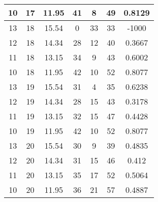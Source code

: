\documentclass[letterpaper, 12pt]{article}
\begin{document}
\begin{longtable}{|c|c|c|c|c|c|c|}
10 & 17 & 11.95 & 41 & 8 & 49 & 0.8129 \\
\hline
13 & 18 & 15.54 & 0 & 33 & 33 & -1000 \\
\hline
12 & 18 & 14.34 & 28 & 12 & 40 & 0.3667 \\
\hline
11 & 18 & 13.15 & 34 & 9 & 43 & 0.6002 \\
\hline
10 & 18 & 11.95 & 42 & 10 & 52 & 0.8077 \\
\hline
13 & 19 & 15.54 & 31 & 4 & 35 & 0.6238 \\
\hline
12 & 19 & 14.34 & 28 & 15 & 43 & 0.3178 \\
\hline
11 & 19 & 13.15 & 32 & 15 & 47 & 0.4428 \\
\hline
10 & 19 & 11.95 & 42 & 10 & 52 & 0.8077 \\
\hline
13 & 20 & 15.54 & 30 & 9 & 39 & 0.4835 \\
\hline
12 & 20 & 14.34 & 31 & 15 & 46 & 0.412 \\
\hline
11 & 20 & 13.15 & 35 & 17 & 52 & 0.5064 \\
\hline
10 & 20 & 11.95 & 36 & 21 & 57 & 0.4887 \\
\hline
\end{longtable}
\end{document}
